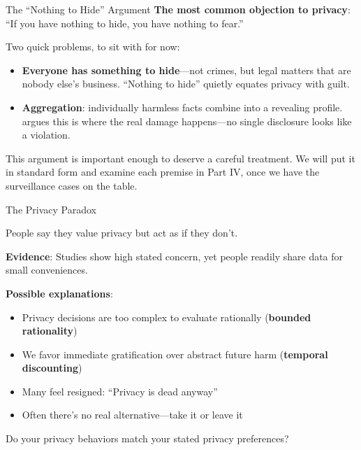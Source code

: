 ﻿\documentclass[aspectratio=169,11pt]{beamer}
\begin{document}
\begin{frame}{The ``Nothing to Hide'' Argument}
\textbf{The most common objection to privacy}: ``If you have nothing to hide, you have nothing to fear.''

\vspace{0.3em}
Two quick problems, to sit with for now:
\begin{itemize}
    \item \textbf{Everyone has something to hide}---not crimes, but legal matters that are nobody else's business. ``Nothing to hide'' quietly equates privacy with guilt.
    \item \textbf{Aggregation}: individually harmless facts combine into a revealing profile. \textcite{solove_understanding_privacy} argues this is where the real damage happens---no single disclosure looks like a violation.
\end{itemize}

\vspace{0.3em}
This argument is important enough to deserve a careful treatment. We will put it in standard form and examine each premise in Part IV, once we have the surveillance cases on the table.
\end{frame}

\begin{frame}{The Privacy Paradox}
\begin{conceptbox}
People say they value privacy but act as if they don't.
\end{conceptbox}

\vspace{0.2em}
\textbf{Evidence}: Studies show high stated concern, yet people readily share data for small conveniences.

\textbf{Possible explanations}:
\begin{itemize}
    \item Privacy decisions are too complex to evaluate rationally (\textbf{bounded rationality})
    \item We favor immediate gratification over abstract future harm (\textbf{temporal discounting})
    \item Many feel resigned: ``Privacy is dead anyway''
    \item Often there's no real alternative---take it or leave it
\end{itemize}

\begin{discussionbox}[Discussion]
Do your privacy behaviors match your stated privacy preferences?
\end{discussionbox}
\end{frame}
\end{document}
